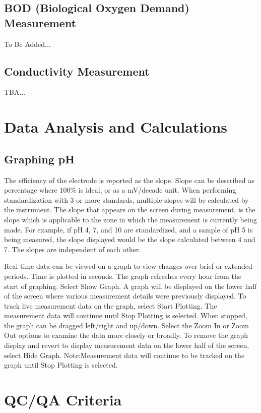 \documentclass[12pt]{../SOP3_beta}\usepackage[]{graphicx}\usepackage[]{color}
\begin{document}
\subsection{BOD (Biological Oxygen Demand) Measurement}
\NP To Be Added...

\subsection{Conductivity Measurement}
\NP TBA...


\section{Data Analysis and Calculations}

\subsection{Graphing pH}
\NP The efficiency of the electrode is reported as the slope. Slope can be described as percentage where 100\% is ideal, or as a mV/decade unit. When performing  standardization with 3 or more standards, multiple slopes will be calculated by the  instrument. The slope that appears on the screen during measurement, is the slope which is applicable to the zone in which the measurement is currently being made. For example, if pH 4, 7, and 10 are standardized, and a sample of pH 5 is being measured, the slope displayed would be the slope calculated between 4 and 7. The slopes are independent of each other. 

\NP Real-time data can be viewed on a graph to view changes over brief or  extended  periods. Time  is  plotted  in  seconds. The  graph  refreshes  every  hour  from  the  start of graphing.
\NP Select Show Graph. A graph will be displayed on the lower half of the screen where various measurement details were previously displayed.  
\NP To track live measurement data on the graph, select 
Start Plotting. The measurement data will continue until 
Stop Plotting is selected. When stopped, the graph can be dragged left/right and up/down.
\NP Select the Zoom In or Zoom Out options to examine the data more closely or broadly.
\NP To remove the graph display and revert to display measurement data on the lower half of the screen, select Hide Graph. Note:Measurement  data  will  continue  to  be  tracked  on  the  graph  until  Stop  Plotting is  selected.  

\section{QC/QA Criteria}
\end{document}
